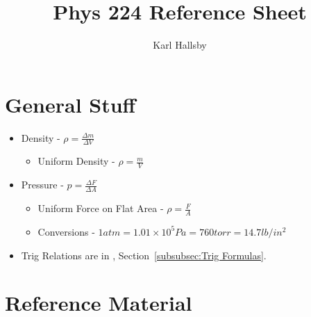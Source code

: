 \documentclass[10pt,letterpaper,final,twoside,notitlepage]{article}
\author{Karl Hallsby}
\title{Phys 224 Reference Sheet}
\numberwithin{equation}{section} %
\theoremstyle{definition}
\theoremstyle{remark}
\begin{document}
	\tableofcontents
	\newpage
	
\section{General Stuff} \label{sec:General}
	\begin{itemize}[noitemsep]
		\item Density - $\rho = \frac{\Delta m}{\Delta V}$
			\begin{itemize}
				\item Uniform Density - $\rho = \frac{m}{V}$
			\end{itemize}
		
		\item Pressure - $p = \frac{\Delta F}{\Delta A}$
			\begin{itemize}
				\item Uniform Force on Flat Area - $\rho = \frac{F}{A}$
				\item Conversions - $1 atm = 1.01 \times 10^5 Pa = 760 torr = 14.7 lb/in^2$
			\end{itemize}
		\item Trig Relations are in , Section~\ref{subsubsec:Trig Formulas}.
	\end{itemize}















\appendix
\clearpage
\section{Reference Material} \label{sec:Reference Material}




\end{document}
